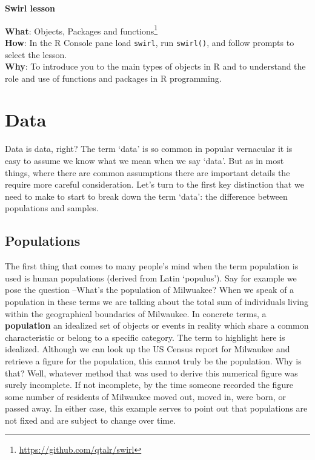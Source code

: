 \documentclass[
  letterpaper,
]{latex/krantz}
\DeclareRobustCommand{\href}[2]{#2\footnote{\url{#1}}}
\begin{document}
\begin{tcolorbox}[enhanced jigsaw, arc=.35mm, leftrule=.75mm, rightrule=.15mm, opacityback=0, colback=white, breakable, bottomrule=.15mm, left=2mm, toprule=.15mm]

\textbf{ Swirl lesson}

\textbf{What}: \href{https://github.com/qtalr/swirl}{Objects, Packages
and functions}\\
\textbf{How}: In the R Console pane load \texttt{swirl}, run
\texttt{swirl()}, and follow prompts to select the lesson.\\
\textbf{Why}: To introduce you to the main types of objects in R and to
understand the role and use of functions and packages in R programming.

\end{tcolorbox}

\hypertarget{data}{%
\section{Data}\label{data}}

Data is data, right? The term `data' is so common in popular vernacular
it is easy to assume we know what we mean when we say `data'. But as in
most things, where there are common assumptions there are important
details the require more careful consideration. Let's turn to the first
key distinction that we need to make to start to break down the term
`data': the difference between populations and samples.

\hypertarget{populations}{%
\subsection{Populations}\label{populations}}

The first thing that comes to many people's mind when the term
population is used is human populations (derived from Latin `populus').
Say for example we pose the question --What's the population of
Milwuakee? When we speak of a population in these terms we are talking
about the total sum of individuals living within the geographical
boundaries of Milwaukee. In concrete terms, a
\textbf{population} an idealized set of objects or
events in reality which share a common characteristic or belong to a
specific category. The term to highlight here is idealized. Although we
can look up the US Census report for Milwaukee and retrieve a figure for
the population, this cannot truly be the population. Why is that? Well,
whatever method that was used to derive this numerical figure was surely
incomplete. If not incomplete, by the time someone recorded the figure
some number of residents of Milwaukee moved out, moved in, were born, or
passed away. In either case, this example serves to point out that
populations are not fixed and are subject to change over time.
\end{document}

